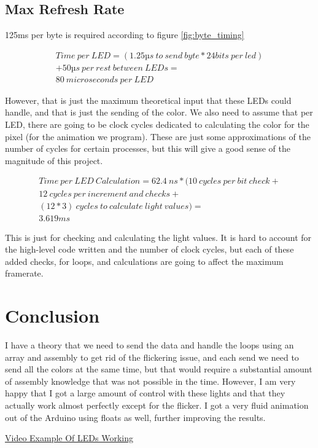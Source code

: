 \documentclass{scrartcl}
\begin{document}
\subsection{Max Refresh Rate}
125ms per byte is required according to figure \ref{fig:byte_timing}

\begin{gather*}
        Time~per~LED = (1.25µs~to~send~byte * 24 bits\:per\:led)\\
        + 50µs~per~rest~between~LEDs = \\ 
        80~microseconds~per~LED
\end{gather*}

However, that is just the maximum theoretical input that these LEDs could handle, and that is just the sending of the color. We also need to assume that per LED, there are going to be clock cycles dedicated to calculating the color for the pixel (for the animation we program). These are just some approximations of the number of cycles for certain processes, but this will give a good sense of the magnitude of this project.

\begin{gather*}
        Time~per~LED~Calculation = 62.4~ns * (10~cycles~per~bit~check +\\ 
        12~cycles~per~increment~and~checks+\\
        (12 * 3)~cycles~to~calculate~light~values) = \\ 
        3.619 ms
\end{gather*}

This is just for checking and calculating the light values. It is hard to account for the high-level code written and the number of clock cycles, but each of these added checks, for loops, and calculations are going to affect the maximum framerate.

\section{Conclusion}
I have a theory that we need to send the data and handle the loops using an array and assembly to get rid of the flickering issue, and each send we need to send all the colors at the same time, but that would require a substantial amount of assembly knowledge that was not possible in the time. However, I am very happy that I got a large amount of control with these lights and that they actually work almost perfectly except for the flicker. I got a very fluid animation out of the Arduino using floats as well, further improving the results.\linebreak

\centerline{\href{https://youtu.be/4BZP083g6_s}{Video Example Of LEDs Working}}
\end{document}
